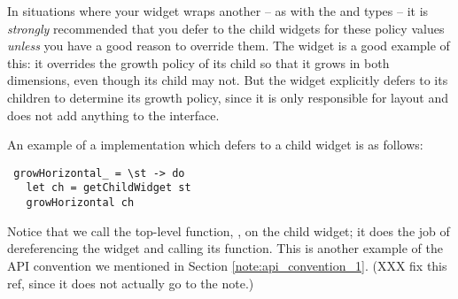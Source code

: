 In situations where your widget wraps another -- as with the 
and  types -- it is \textit{strongly} recommended that
you defer to the child widgets for these policy values \textit{unless}
you have a good reason to override them.  The  widget is
a good example of this: it overrides the growth policy of its child so
that it grows in both dimensions, even though its child may not.  But
the  widget explicitly defers to its children to determine its
growth policy, since it is only responsible for layout and does not
add anything to the interface.

An example of a  implementation which defers to a
child widget is as follows:

\begin{verbatim}
 growHorizontal_ = \st -> do
   let ch = getChildWidget st
   growHorizontal ch
\end{verbatim}

Notice that we call the top-level function, , on
the child widget; it does the job of dereferencing the widget and
calling its  function.  This is another example
of the API convention we mentioned in Section
\ref{note:api_convention_1}. (XXX fix this ref, since it does not
actually go to the note.)

